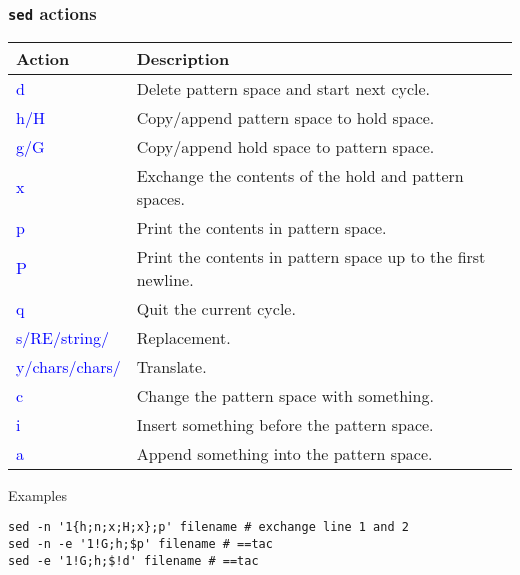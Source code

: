 \documentclass[red]{beamer}
\begin{document}
\begin{CJK*}{UTF8}{gbsn}
\begin{frame}
\frametitle{\texttt{sed} actions}
\begin{table}[ht]
\tiny
\renewcommand\arraystretch{1.2}
\begin{tabular}{ll}
\hline
\textbf{Action} & \textbf{Description}\\
\hline
\textcolor{blue}{d} & Delete pattern space and start next cycle.\\
\textcolor{blue}{h/H} & Copy/append pattern space to hold space.\\
\textcolor{blue}{g/G} & Copy/append hold space to pattern space.\\
\textcolor{blue}{x} & Exchange the contents of the hold and pattern spaces.\\
\textcolor{blue}{p} & Print the contents in pattern space.\\
\textcolor{blue}{P} & Print the contents in pattern space up to the first newline.\\
\textcolor{blue}{q} & Quit the current cycle.\\ 
\textcolor{blue}{s/RE/string/} & Replacement.\\
\textcolor{blue}{y/chars/chars/} & Translate.\\
\textcolor{blue}{c} & Change the pattern space with something.\\
\textcolor{blue}{i} & Insert something before the pattern space.\\
\textcolor{blue}{a} & Append something into the pattern space.\\ 
\hline
\end{tabular}
\end{table}
\begin{block}{\centering\footnotesize Examples}
\begin{lstlisting}
sed -n '1{h;n;x;H;x};p' filename # exchange line 1 and 2
sed -n -e '1!G;h;$p' filename # ==tac
sed -e '1!G;h;$!d' filename # ==tac
\end{lstlisting}
\end{block}
\end{frame}



\end{CJK*}
\end{document}
